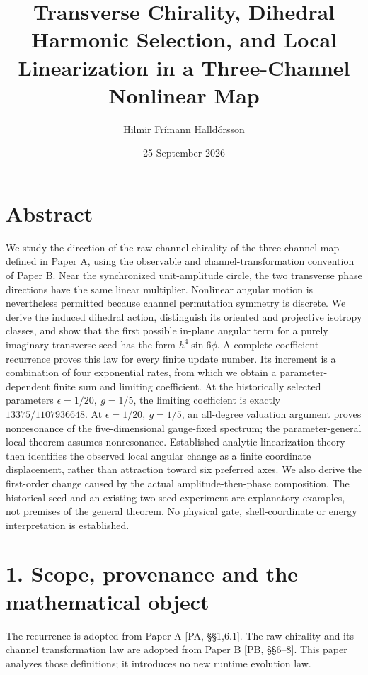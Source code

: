 \documentclass[
  11pt,
  a4paper,
]{article}
\title{Transverse Chirality, Dihedral Harmonic Selection, and Local Linearization in a Three-Channel Nonlinear Map}
\author{Hilmir Frímann Halldórsson}
\date{25 September 2026}
\begin{document}
\maketitle

\section{Abstract}\label{abstract}

We study the direction of the raw channel chirality of the three-channel map defined in Paper A, using the observable and channel-transformation convention of Paper B. Near the synchronized unit-amplitude circle, the two transverse phase directions have the same linear multiplier. Nonlinear angular motion is nevertheless permitted because channel permutation symmetry is discrete. We derive the induced dihedral action, distinguish its oriented and projective isotropy classes, and show that the first possible in-plane angular term for a purely imaginary transverse seed has the form \(h^4\sin6\phi\). A complete coefficient recurrence proves this law for every finite update number. Its increment is a combination of four exponential rates, from which we obtain a parameter-dependent finite sum and limiting coefficient. At the historically selected parameters \(\epsilon=1/20,\ g=1/5\), the limiting coefficient is exactly \(13375/1107936648\). At \(\epsilon=1/20,\ g=1/5\), an all-degree valuation argument proves nonresonance of the five-dimensional gauge-fixed spectrum; the parameter-general local theorem assumes nonresonance. Established analytic-linearization theory then identifies the observed local angular change as a finite coordinate displacement, rather than attraction toward six preferred axes. We also derive the first-order change caused by the actual amplitude-then-phase composition. The historical seed and an existing two-seed experiment are explanatory examples, not premises of the general theorem. No physical gate, shell-coordinate or energy interpretation is established.

\section{1. Scope, provenance and the mathematical object}\label{scope-provenance-and-the-mathematical-object}

The recurrence is adopted from Paper A {[}PA, §§1,6.1{]}. The raw chirality and its channel transformation law are adopted from Paper B {[}PB, §§6--8{]}. This paper analyzes those definitions; it introduces no new runtime evolution law.
\end{document}
